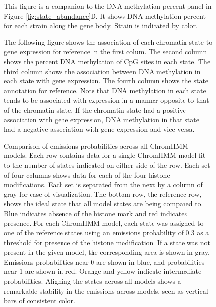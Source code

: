 \documentclass[
  11pt,
]{article}
\begin{document}
\begin{figure}[ht!]
\caption{This figure is a companion to the DNA methylation 
percent panel in Figure \ref{fig:state_abundance}D. It shows 
DNA methylation percent for each strain along the gene body. 
Strain is indicated by color.
}
\label{supp_fig:percent_methyl_by_strain}
\end{figure}

\begin{figure}[ht!]
\caption{The following figure shows the association of each chromatin 
state to gene expression for reference in the first colum. The
second column shows the percent DNA methylation of CpG sites in 
each state. The third column shows the association between DNA 
methylation in each state with gene expression. The fourth column
shows the state annotation for reference. Note that DNA methylation
in each state tends to be associated with expression in a manner
opposite to that of the chromatin state. If the chromatin state
had a positive association with gene expression, DNA methylation 
in that state had a negative association with gene expression and
vice versa.
}
\label{supp_fig:methyl_effect_by_state}
\end{figure}

\begin{figure}[ht!]
\caption{Comparison of emissions probabilities across all ChromHMM models.
Each row contains data for a single ChromHMM model fit to the number of
states indicated on either side of the row. Each set of four columns shows
data for each of the four histone modifications. Each set is separated from
the next by a column of gray for ease of visualization. The bottom row, the
reference row, shows the ideal state that all model states are being compared
to. Blue indicates absence of the histone mark and red indicates presence.
For each ChromHMM model, each state was assigned to one of the reference states
using an emissions probability of 0.3 as a threshold for presence of the histone
modification. If a state was not present in the given model, the corresponding
area is shown in gray. Emissions probabilities near 0 are shown in blue, and 
probabilities near 1 are shown in red. Orange and yellow indicate intermediate
probabilities. Aligning the states across all models shows a remarkable 
stability in the emissions across models, seen as vertical bars of consistent 
color.}
\label{supp_fig:model_emissions_comparison}
\end{figure}
\end{document}
